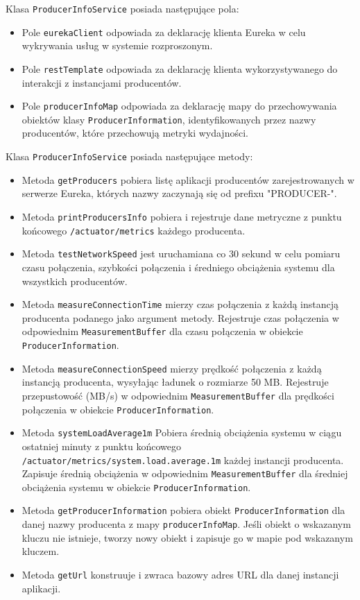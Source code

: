 Klasa \verb|ProducerInfoService| posiada następujące pola:
\begin{itemize}
    \item Pole \verb|eurekaClient| odpowiada za deklarację klienta Eureka w celu wykrywania usług w systemie rozproszonym.
    \item Pole \verb|restTemplate| odpowiada za deklarację klienta  wykorzystywanego do interakcji z instancjami producentów.
    \item Pole \verb|producerInfoMap| odpowiada za deklarację mapy do przechowywania obiektów klasy \verb|ProducerInformation|, identyfikowanych przez nazwy producentów, które przechowują metryki wydajności.
\end{itemize}

Klasa \verb|ProducerInfoService| posiada następujące metody:
\begin{itemize}
    \item Metoda \verb|getProducers| pobiera listę aplikacji producentów zarejestrowanych w serwerze Eureka, których nazwy zaczynają się od prefixu "PRODUCER-".
    \item Metoda \verb|printProducersInfo| pobiera i rejestruje dane metryczne z punktu końcowego \verb|/actuator/metrics| każdego producenta.
    \item Metoda \verb|testNetworkSpeed| jest uruchamiana co 30 sekund w celu pomiaru czasu połączenia, szybkości połączenia i średniego obciążenia systemu dla wszystkich producentów.
    \item Metoda \verb|measureConnectionTime| mierzy czas połączenia z każdą instancją producenta podanego jako argument metody. Rejestruje czas połączenia w odpowiednim \verb|MeasurementBuffer| dla czasu połączenia w obiekcie \verb|ProducerInformation|.
    \item Metoda \verb|measureConnectionSpeed| mierzy prędkość połączenia z każdą instancją producenta, wysyłając ładunek o rozmiarze 50 MB. Rejestruje przepustowość (MB/s) w odpowiednim \verb|MeasurementBuffer| dla prędkości połączenia w obiekcie \verb|ProducerInformation|.
    \item Metoda \verb|systemLoadAverage1m| Pobiera średnią obciążenia systemu w ciągu ostatniej minuty z punktu końcowego \verb|/actuator/metrics/system.load.average.1m| każdej instancji producenta. Zapisuje średnią obciążenia w odpowiednim \verb|MeasurementBuffer| dla średniej obciążenia systemu w obiekcie \verb|ProducerInformation|.
    \item Metoda \verb|getProducerInformation| pobiera obiekt \verb|ProducerInformation| dla danej nazwy producenta z mapy \verb|producerInfoMap|. Jeśli obiekt o wskazanym kluczu nie istnieje, tworzy nowy obiekt i zapisuje go w mapie pod wskazanym kluczem.
    \item Metoda \verb|getUrl| konstruuje i zwraca bazowy adres URL dla danej instancji aplikacji.
\end{itemize}

